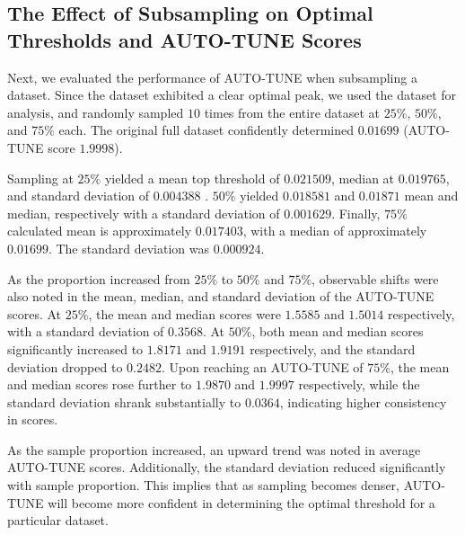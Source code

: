 \documentclass[utf8]{FrontiersinHarvard} %
\newcommand{\TODO}[1]{{\color{red}{#1}}}
\begin{document}
\subsection{The Effect of Subsampling on Optimal Thresholds and AUTO-TUNE Scores}

\TODO{Also should include some motivation}

Next, we evaluated the performance of AUTO-TUNE when subsampling a dataset.
Since the \citep{rhee_national_2019} dataset exhibited a clear optimal peak, we
used the dataset for analysis, and randomly sampled $10$ times from the entire
dataset at $25\%$, $50\%$, and $75\%$ each. The original full dataset
confidently determined $0.01699$ (AUTO-TUNE score $1.9998$).

Sampling at $25\%$ yielded a mean top threshold of $0.021509$, median at
$0.019765$, and standard deviation of $0.004388$ \label{fig:subsampling}.
$50\%$ yielded $0.018581$ and $0.01871$ mean and median, respectively with a
standard deviation of $0.001629$. Finally, $75\%$ calculated mean is
approximately $0.017403$, with a median of approximately $0.01699$. The
standard deviation was $0.000924$.

\TODO{explain why the trend of HIGHER thresholds for the SPARSER sampling makes sense}

As the proportion increased from $25\%$ to $50\%$ and $75\%$, observable shifts
were also noted in the mean, median, and standard deviation of the AUTO-TUNE
scores. At $25\%$, the mean and median scores were $1.5585$ and $1.5014$
respectively, with a standard deviation of $0.3568$. At $50\%$, both mean and
median scores significantly increased to $1.8171$ and $1.9191$ respectively,
and the standard deviation dropped to $0.2482$. Upon reaching an AUTO-TUNE of
$75\%$, the mean and median scores rose further to $1.9870$ and $1.9997$
respectively, while the standard deviation shrank substantially to $0.0364$,
indicating higher consistency in scores.

As the sample proportion increased, an upward trend was noted in average
AUTO-TUNE scores. Additionally, the standard deviation reduced significantly
with sample proportion. This implies that as sampling becomes denser, AUTO-TUNE
will become more confident in determining the optimal threshold for a
particular dataset.

\TODO{I still think that being able to show what fraction of the nodes connected in the full network are connected in the subsampled networks;
	if you have network JSONs, I can check that pretty quickly}
\end{document}
